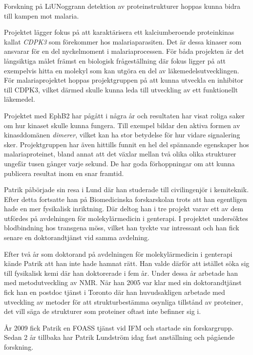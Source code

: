 \begin{news}{3}{Forskning på LiU}{Noggrann detektion av
    proteinstrukturer hoppas kunna bidra till kampen mot malaria.}{}{}


Projektet lägger fokus på att karaktärisera ett kalciumberoende proteinkinas
kallat \emph{CDPK3} som förekommer hos malariaparasiten. Det är dessa kinaser
som ansvarar för en del nyckelmoment i malariaprocessen.
För båda projekten är det långsiktiga målet främst en biologisk
frågeställning där fokus ligger på att exempelvis hitta en molekyl som kan
utgöra en del av läkemedelsutvecklingen. För malariaprojektet hoppas 
projektgruppen på att kunna utveckla en inhibitor till CDPK3, vilket därmed
skulle kunna leda till utveckling av ett funktionellt läkemedel.

Projektet med EphB2 har pågått i några år och resultaten har visat roliga
saker om hur kinaset skulle kunna fungera. Till exempel bildar den aktiva
formen av kinasddomänen \emph{dimerer}, vilket kan ha stor betydelse för hur
vidare signalering sker. Projektgruppen har även hittills funnit en hel del
spännande egenskaper hos malariaproteinet, bland annat att det växlar mellan
två olika olika strukturer ungefär tusen gånger varje sekund. De har goda
förhoppningar om att kunna publicera resultat inom en snar framtid.

Patrik påbörjade sin resa i Lund där han studerade till civilingenjör i
kemiteknik. Efter detta fortsatte han på Biomedicinska forskarskolan trots
att han egentligen hade en mer fysikalisk inriktning. Där deltog han i tre
projekt varav ett av dem utfördes på avdelningen för molekylärmedicin i
genterapi. I projektet undersöktes blodbindning hos transgena möss, vilket
han tyckte var intressant och han fick senare en doktorandtjänst vid samma
avdelning.

Efter två år som doktorand på avdelningen för molekylärmedicin i
genterapi kände Patrik att han inte hade hamnat rätt. Han valde därför att
istället söka sig till fysikalisk kemi där han doktorerade i fem år. Under
dessa år arbetade han med metodutveckling av NMR. När han 2005 var klar med
sin doktorandtjänst fick han en postdoc tjänst i Toronto där han
huvudsakligen arbetade med utveckling av metoder för att strukturbestämma
osynliga tillstånd av proteiner, det vill säga de strukturer som proteiner
oftast inte befinner sig i.

År 2009 fick Patrik en FOASS tjänst vid IFM och startade sin
forskargrupp. Sedan 2 år tillbaka har Patrik Lundström idag fast
anställning och pågående forskning.

\end{news}
